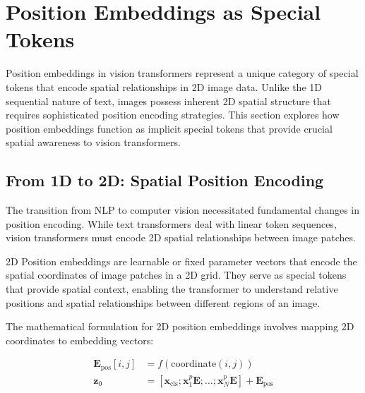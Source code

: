 
\section{Position Embeddings as Special Tokens}

Position embeddings in vision transformers represent a unique category of special tokens that encode spatial relationships in 2D image data. Unlike the 1D sequential nature of text, images possess inherent 2D spatial structure that requires sophisticated position encoding strategies. This section explores how position embeddings function as implicit special tokens that provide crucial spatial awareness to vision transformers.

\subsection{From 1D to 2D: Spatial Position Encoding}

The transition from NLP to computer vision necessitated fundamental changes in position encoding. While text transformers deal with linear token sequences, vision transformers must encode 2D spatial relationships between image patches.

\begin{definition}
2D Position embeddings are learnable or fixed parameter vectors that encode the spatial coordinates of image patches in a 2D grid. They serve as special tokens that provide spatial context, enabling the transformer to understand relative positions and spatial relationships between different regions of an image.
\end{definition}

The mathematical formulation for 2D position embeddings involves mapping 2D coordinates to embedding vectors:

\begin{align}
\mathbf{E}_{\text{pos}}[i,j] &= f(\text{coordinate}(i,j)) \\
\mathbf{z}_0 &= [\mathbf{x}_{\text{cls}}; \mathbf{x}_1^p\mathbf{E}; \ldots; \mathbf{x}_N^p\mathbf{E}] + \mathbf{E}_{\text{pos}}
\end{align}

